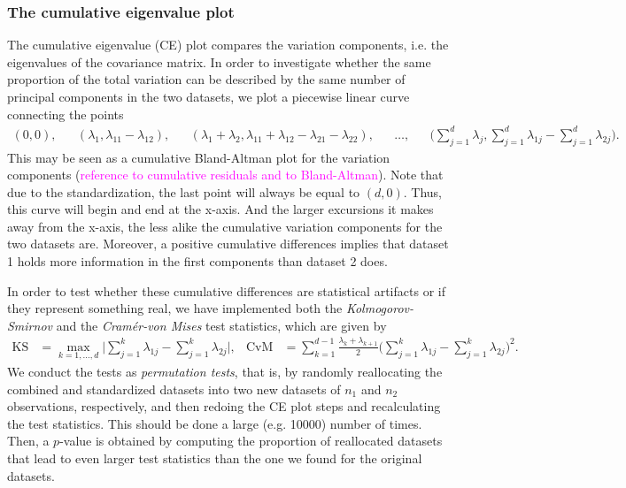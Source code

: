 \documentclass[titlepage,11pt,twoside]{article}
\newcommand{\hl}[1]{\textcolor{magenta}{#1}}
\begin{document}
\subsubsection{The cumulative eigenvalue plot}
 The cumulative eigenvalue (CE) plot compares the variation components, i.e. the eigenvalues of the covariance matrix.
In order to investigate whether the same proportion of the total variation can be described by the same number of principal components in the two datasets, we plot a piecewise linear curve connecting the points
\begin{align*}
(0,0), &&
(\lambda_1,\lambda_{11}-\lambda_{12}), &&
(\lambda_1 + \lambda_2,\lambda_{11}+\lambda_{12}-\lambda_{21}-\lambda_{22}), &&
\ldots, &&
\bigg( \sum_{j=1}^d \lambda_j, \sum_{j=1}^d \lambda_{1j} - \sum_{j=1}^d \lambda_{2j} \bigg).
\end{align*}
This may be seen as a cumulative Bland-Altman plot for the variation components (\hl{reference to cumulative residuals and to Bland-Altman}). Note that due to the standardization, the last point will always be equal to $(d,0)$. Thus, this curve will begin and end at the x-axis. And the larger excursions it makes away from the x-axis, the less alike the cumulative variation components for the two datasets are. Moreover, a positive cumulative differences implies that dataset 1 holds more information in the first components than dataset 2 does. 

In order to test whether these cumulative differences are statistical artifacts or if they represent something real, we have implemented both the \emph{Kolmogorov-Smirnov} and the \emph{Cram\'er-von Mises} test statistics, which are given by
\begin{align*}
\text{KS} &= \max_{k=1,\dotsc,d} \bigg\lvert \sum_{j=1}^k \lambda_{1j} - \sum_{j=1}^k \lambda_{2j} \bigg\rvert, &
\text{CvM} &= \sum_{k=1}^{d-1} \frac{\lambda_k + \lambda_{k+1}}{2} \bigg( \sum_{j=1}^k \lambda_{1j} - \sum_{j=1}^k \lambda_{2j} \bigg)^2.
\end{align*}
We conduct the tests as \textit{permutation tests}, that is, by randomly reallocating the combined and standardized datasets into two new datasets of $n_1$ and $n_2$ observations, respectively, and then redoing the CE plot steps and recalculating the test statistics. This should be done a large (e.g. 10000) number of times. Then, a $p$-value is obtained by computing the proportion of reallocated datasets that lead to even larger test statistics than the one we found for the original datasets. 
\end{document}
